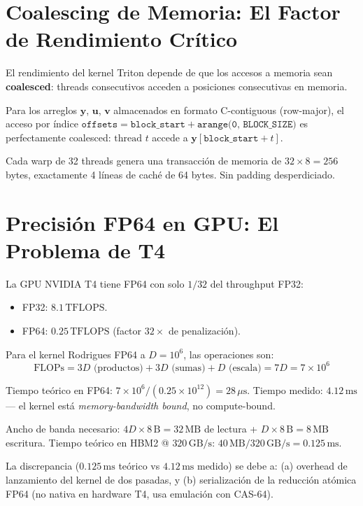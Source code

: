 \section{Coalescing de Memoria: El Factor de Rendimiento Crítico}

El rendimiento del kernel Triton depende de que los accesos a memoria sean
\textbf{coalesced}: threads consecutivos acceden a posiciones consecutivas en memoria.

Para los arreglos $\mathbf{y}$, $\mathbf{u}$, $\mathbf{v}$ almacenados en formato
C-contiguous (row-major), el acceso por índice $\texttt{offsets} = \texttt{block\_start} + \texttt{arange(0, BLOCK\_SIZE)}$
es perfectamente coalesced: $\text{thread } t$ accede a $\mathbf{y}[\texttt{block\_start} + t]$.

Cada warp de 32 threads genera una transacción de memoria de $32 \times 8 = 256$ bytes,
exactamente 4 líneas de caché de 64 bytes. Sin padding desperdiciado.

\section{Precisión FP64 en GPU: El Problema de T4}

La GPU NVIDIA T4 tiene FP64 con solo $1/32$ del throughput FP32:
\begin{itemize}
\item FP32: $8.1\,\text{TFLOPS}$.
\item FP64: $0.25\,\text{TFLOPS}$ (factor $32\times$ de penalización).
\end{itemize}

Para el kernel Rodrigues FP64 a $D = 10^6$, las operaciones son:
\begin{equation}
\text{FLOPs} = 3D \text{ (productos)} + 3D \text{ (sumas)} + D \text{ (escala)} = 7D = 7 \times 10^6
\end{equation}

Tiempo teórico en FP64: $7 \times 10^6 / (0.25 \times 10^{12}) = 28\,\mu\text{s}$.
Tiempo medido: $4.12\,\text{ms}$ --- el kernel está \textit{memory-bandwidth bound}, no compute-bound.

Ancho de banda necesario: $4D \times 8\,\text{B} = 32\,\text{MB}$ de lectura + $D \times 8\,\text{B} = 8\,\text{MB}$ escritura.
Tiempo teórico en HBM2 @ $320\,\text{GB/s}$: $40\,\text{MB}/320\,\text{GB/s} = 0.125\,\text{ms}$.

La discrepancia ($0.125\,\text{ms}$ teórico vs $4.12\,\text{ms}$ medido) se debe a:
(a) overhead de lanzamiento del kernel de dos pasadas, y (b) serialización de la
reducción atómica FP64 (no nativa en hardware T4, usa emulación con CAS-64).

